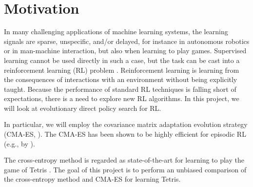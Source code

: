 \section*{Motivation}
In many challenging applications of machine learning systems, the
learning signals are sparse, unspecific, and/or delayed, for instance
in autonomous robotics or in man-machine interaction, but also when
learning to play games. Supervised
learning cannot be used directly in such a case, but the task can be
cast into a reinforcement learning (RL) problem \citep{littman:15}. Reinforcement
learning is learning from the consequences of interactions with an
environment without being explicitly taught. Because the performance
of standard RL techniques is falling short of expectations, there is a
need to explore new RL algorithms. In this project, we will look at
evolutionary direct policy search for RL.


In particular, we will employ the covariance matrix adaptation
evolution strategy (CMA-ES, \citep{hansen:01,hansen2011}). The CMA-ES has been shown to be highly efficient for episodic RL
(e.g., by \cite{heidrich-meisner:09}).

The cross-entropy method is regarded as state-of-the-art for learning
to play the game of Tetris \citep{szita:06,thiery:09}. The goal of
this project is to perform an unbiased comparison of the cross-entropy
method and CMA-ES for learning Tetris.




